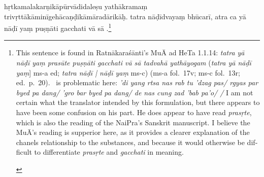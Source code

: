 \documentclass[naipra.tex]{subfiles}
\begin{document}
\begin{sanskrit}

\pstart
hṛtkamalakarṇikāpūrvādidaleṣu yathākramaṃ trivṛttā\dsh kāminī\dsh gehā\dsh caṇḍikā\dsh māradārikāḥ. 
tatra  nāḍīdvayaṃ bhūcarī, 
atra ca yā nāḍī yaṃ  puṣṇāti gacchati vā sā .\footnote{
	\begin{english}%
		This sentence is found in Ratnākaraśānti's MuĀ ad HeTa 1.1.14: \emph{tatra yā nāḍī yaṃ prasūte puṣṇāti gacchati vā sā tadvahā yathāyogam} (\emph{tatra yā nāḍī yaṃ}] ms-a ed; \emph{tatra nāḍī | nāḍī yaṃ} ms-c) (ms-a fol.\ 17v; ms-c fol.\ 13r; ed.\ p.\ 20).
		\TIB\ is problematic here: \emph{'di yang rtsa nas rab tu 'dzag pas/ rgyas par byed pa dang/ 'gro bar byed pa dang/ de nas cung zad 'bab pa'o/ /}
		I am not certain what the translator intended by this formulation, but there appears to have been some confusion on his part.
		He does appear to have read \emph{prasṛte}, which is also the reading of the NaiPra's Sanskrit manuscript.
		I believe the MuĀ's reading is supperior here, as it provides a clearer explanation of the chanels relationship to the substances, and because it would otherwise be difficult to differentiate \emph{prasṛte} and \emph{gacchati} in meaning.
	\end{english}
} 
\pend




\end{sanskrit}
\end{document}
